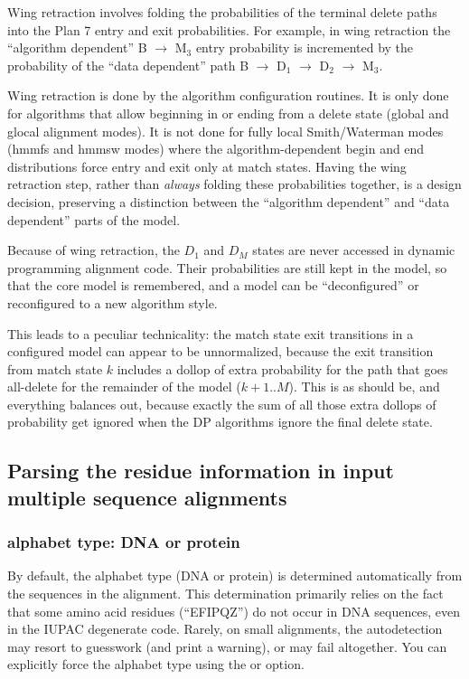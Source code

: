 Wing retraction involves folding the probabilities of the terminal
delete paths into the Plan 7 entry and exit probabilities. For
example, in wing retraction the ``algorithm dependent'' B
$\rightarrow$ M$_{3}$ entry probability is incremented by the
probability of the ``data dependent'' path B $\rightarrow$ D$_1$
$\rightarrow$ D$_2$ $\rightarrow$ M$_3$.

Wing retraction is done by the algorithm configuration routines. It is
only done for algorithms that allow beginning in or ending from a
delete state (global and glocal alignment modes). It is not done for
fully local Smith/Waterman modes (hmmfs and hmmsw modes) where the
algorithm-dependent begin and end distributions force entry and exit
only at match states.  Having the wing retraction step, rather than
{\em always} folding these probabilities together, is a design
decision, preserving a distinction between the ``algorithm dependent''
and ``data dependent'' parts of the model.

Because of wing retraction, the $D_1$ and $D_M$ states are never
accessed in dynamic programming alignment code. Their probabilities
are still kept in the model, so that the core model is remembered, and
a model can be ``deconfigured'' or reconfigured to a new algorithm
style. 

This leads to a peculiar technicality: the match state exit
transitions in a configured model can appear to be unnormalized,
because the exit transition from match state $k$ includes a dollop of
extra probability for the path that goes all-delete for the remainder
of the model ($k+1..M$). This is as should be, and everything balances
out, because exactly the sum of all those extra dollops of probability
get ignored when the DP algorithms ignore the final delete state.

\subsection{Parsing the residue information in input multiple sequence alignments}

\subsubsection{alphabet type: DNA or protein}

By default, the alphabet type (DNA or protein) is determined
automatically from the sequences in the alignment. This determination
primarily relies on the fact that some amino acid residues
(``EFIPQZ'') do not occur in DNA sequences, even in the IUPAC
degenerate code. Rarely, on small alignments, the autodetection may
resort to guesswork (and print a warning), or may fail altogether. You
can explicitly force the alphabet type using the  or
 option. 

